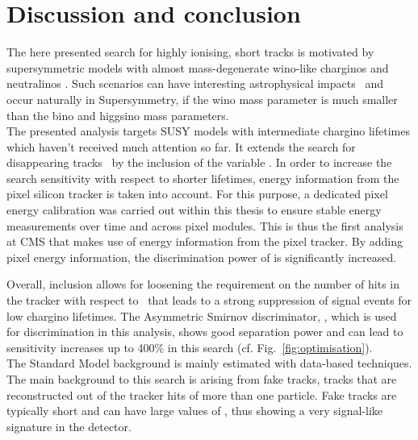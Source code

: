\FloatBarrier
\chapter{Discussion and conclusion}
\label{sec:Discussion}

The here presented search for highly ionising, short tracks is motivated by supersymmetric models with almost mass-degenerate wino-like charginos \chipm and neutralinos \chiO.
Such scenarios can have interesting astrophysical impacts~\cite{bib:Moroi:DarkMatter_2013} and occur naturally in Supersymmetry, if the wino mass parameter is much smaller than the bino and higgsino mass parameters.\\

The presented analysis targets SUSY models with intermediate chargino lifetimes which haven't received much attention so far.
It extends the search for disappearing tracks~\cite{bib:CMS:DT_8TeV} by the inclusion of the variable \dedx.
In order to increase the search sensitivity with respect to shorter lifetimes, energy information from the pixel silicon tracker is taken into account.
For this purpose, a dedicated pixel energy calibration was carried out within this thesis to ensure stable energy measurements over time and across pixel modules.
This is thus the first analysis at CMS that makes use of energy information from the pixel tracker.
By adding pixel energy information, the discrimination power of \dedx is significantly increased.

Overall, \dedx inclusion allows for loosening the requirement on the number of hits in the tracker with respect to~\cite{bib:CMS:DT_8TeV} that leads to a strong suppression of signal events for low chargino lifetimes. 
The Asymmetric Smirnov discriminator, \ias, which is used for \dedx discrimination in this analysis, shows good separation power and can lead to sensitivity increases up to 400\% in this search (cf. Fig.~\ref{fig:optimisation}).\\

The Standard Model background is mainly estimated with data-based techniques.
The main background to this search is arising from fake tracks, \ie tracks that are reconstructed out of the tracker hits of more than one particle.
Fake tracks are typically short and can have large values of \ias, thus showing a very signal-like signature in the detector.


